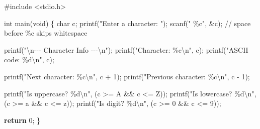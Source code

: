 \documentclass[
  letterpaper,
  DIV=11,
  numbers=noendperiod]{scrreprt}
\newenvironment{Shaded}{\begin{snugshade}}{\end{snugshade}}
\newcommand{\CharTok}[1]{\textcolor[rgb]{0.13,0.47,0.30}{#1}}
\newcommand{\CommentTok}[1]{\textcolor[rgb]{0.37,0.37,0.37}{#1}}
\newcommand{\ControlFlowTok}[1]{\textcolor[rgb]{0.00,0.23,0.31}{\textbf{#1}}}
\newcommand{\DataTypeTok}[1]{\textcolor[rgb]{0.68,0.00,0.00}{#1}}
\newcommand{\DecValTok}[1]{\textcolor[rgb]{0.68,0.00,0.00}{#1}}
\newcommand{\ImportTok}[1]{\textcolor[rgb]{0.00,0.46,0.62}{#1}}
\newcommand{\NormalTok}[1]{\textcolor[rgb]{0.00,0.23,0.31}{#1}}
\newcommand{\OperatorTok}[1]{\textcolor[rgb]{0.37,0.37,0.37}{#1}}
\newcommand{\PreprocessorTok}[1]{\textcolor[rgb]{0.68,0.00,0.00}{#1}}
\newcommand{\SpecialCharTok}[1]{\textcolor[rgb]{0.37,0.37,0.37}{#1}}
\newcommand{\StringTok}[1]{\textcolor[rgb]{0.13,0.47,0.30}{#1}}
\begin{document}
\begin{Shaded}
\begin{Highlighting}[]
\PreprocessorTok{\#include }\ImportTok{\textless{}stdio.h\textgreater{}}

\DataTypeTok{int}\NormalTok{ main}\OperatorTok{(}\DataTypeTok{void}\OperatorTok{)} \OperatorTok{\{}
    \DataTypeTok{char}\NormalTok{ c}\OperatorTok{;}
\NormalTok{    printf}\OperatorTok{(}\StringTok{"Enter a character: "}\OperatorTok{);}
\NormalTok{    scanf}\OperatorTok{(}\StringTok{" }\SpecialCharTok{\%c}\StringTok{"}\OperatorTok{,} \OperatorTok{\&}\NormalTok{c}\OperatorTok{);}   \CommentTok{// space before \%c skips whitespace}

\NormalTok{    printf}\OperatorTok{(}\StringTok{"}\SpecialCharTok{\textbackslash{}n}\StringTok{{-}{-}{-} Character Info {-}{-}{-}}\SpecialCharTok{\textbackslash{}n}\StringTok{"}\OperatorTok{);}
\NormalTok{    printf}\OperatorTok{(}\StringTok{"Character: }\SpecialCharTok{\%c\textbackslash{}n}\StringTok{"}\OperatorTok{,}\NormalTok{ c}\OperatorTok{);}
\NormalTok{    printf}\OperatorTok{(}\StringTok{"ASCII code: }\SpecialCharTok{\%d\textbackslash{}n}\StringTok{"}\OperatorTok{,}\NormalTok{ c}\OperatorTok{);}

\NormalTok{    printf}\OperatorTok{(}\StringTok{"Next character: }\SpecialCharTok{\%c\textbackslash{}n}\StringTok{"}\OperatorTok{,}\NormalTok{ c }\OperatorTok{+} \DecValTok{1}\OperatorTok{);}
\NormalTok{    printf}\OperatorTok{(}\StringTok{"Previous character: }\SpecialCharTok{\%c\textbackslash{}n}\StringTok{"}\OperatorTok{,}\NormalTok{ c }\OperatorTok{{-}} \DecValTok{1}\OperatorTok{);}

\NormalTok{    printf}\OperatorTok{(}\StringTok{"Is uppercase? }\SpecialCharTok{\%d\textbackslash{}n}\StringTok{"}\OperatorTok{,} \OperatorTok{(}\NormalTok{c }\OperatorTok{\textgreater{}=} \CharTok{\textquotesingle{}A\textquotesingle{}} \OperatorTok{\&\&}\NormalTok{ c }\OperatorTok{\textless{}=} \CharTok{\textquotesingle{}Z\textquotesingle{}}\OperatorTok{));}
\NormalTok{    printf}\OperatorTok{(}\StringTok{"Is lowercase? }\SpecialCharTok{\%d\textbackslash{}n}\StringTok{"}\OperatorTok{,} \OperatorTok{(}\NormalTok{c }\OperatorTok{\textgreater{}=} \CharTok{\textquotesingle{}a\textquotesingle{}} \OperatorTok{\&\&}\NormalTok{ c }\OperatorTok{\textless{}=} \CharTok{\textquotesingle{}z\textquotesingle{}}\OperatorTok{));}
\NormalTok{    printf}\OperatorTok{(}\StringTok{"Is digit?     }\SpecialCharTok{\%d\textbackslash{}n}\StringTok{"}\OperatorTok{,} \OperatorTok{(}\NormalTok{c }\OperatorTok{\textgreater{}=} \CharTok{\textquotesingle{}0\textquotesingle{}} \OperatorTok{\&\&}\NormalTok{ c }\OperatorTok{\textless{}=} \CharTok{\textquotesingle{}9\textquotesingle{}}\OperatorTok{));}

    \ControlFlowTok{return} \DecValTok{0}\OperatorTok{;}
\OperatorTok{\}}
\end{Highlighting}
\end{Shaded}
\end{document}
